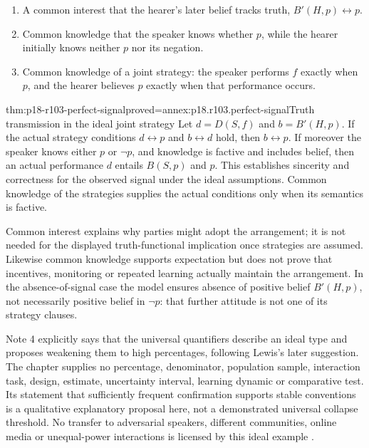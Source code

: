 \begin{enumerate}
\item A common interest that the hearer's later belief tracks truth,
      \(B'(H,p)\leftrightarrow p\).
\item Common knowledge that the speaker knows whether \(p\), while
      the hearer initially knows neither \(p\) nor its negation.
\item Common knowledge of a joint strategy: the speaker performs
      \(f\) exactly when \(p\), and the hearer believes \(p\)
      exactly when that performance occurs.
\end{enumerate}

\begin{hbtheorem}{thm:p18-r103-perfect-signal}{proved=annex:p18.r103.perfect-signal}{Truth transmission in the ideal joint strategy}
Let \(d=D(S,f)\) and \(b=B'(H,p)\). If the actual strategy conditions
\(d\leftrightarrow p\) and \(b\leftrightarrow d\) hold, then
\(b\leftrightarrow p\). If moreover the speaker knows either
\(p\) or \(\neg p\), and knowledge is factive and includes belief,
then an actual performance \(d\) entails \(B(S,p)\) and \(p\).
This establishes sincerity and correctness for the observed signal
under the ideal assumptions. Common knowledge of the strategies supplies
the actual conditions only when its semantics is factive.
\end{hbtheorem}

Common interest explains why parties might adopt the arrangement; it is
not needed for the displayed truth-functional implication once strategies
are assumed. Likewise common knowledge supports expectation but does not
prove that incentives, monitoring or repeated learning actually maintain
the arrangement. In the absence-of-signal case the model ensures absence
of positive belief \(B'(H,p)\), not necessarily positive belief in
\(\neg p\): that further attitude is not one of its strategy clauses.

Note 4 explicitly says that the universal quantifiers describe an ideal
type and proposes weakening them to high percentages, following Lewis's
later suggestion. The chapter supplies no percentage, denominator,
population sample, interaction task, design, estimate, uncertainty interval,
learning dynamic or comparative test. Its statement that sufficiently
frequent confirmation supports stable conventions is a qualitative
explanatory proposal here, not a demonstrated universal collapse threshold.
No transfer to adversarial speakers, different communities, online media
or unequal-power interactions is licensed by this ideal example
\cite[pp.~603--604, 608; p.~609, n.~4]{Meggle2021RationalityCommunication}.


